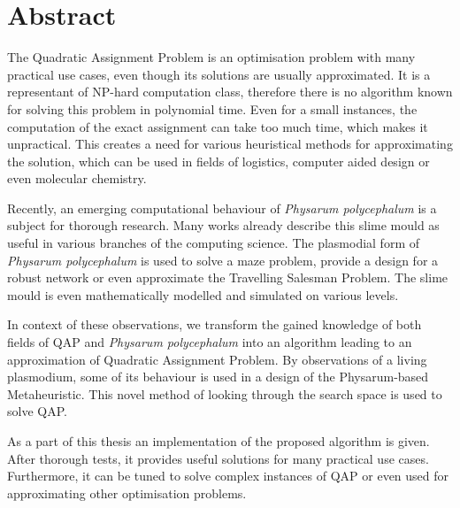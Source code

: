 \chapter*{Abstract}

The Quadratic Assignment Problem is an optimisation problem with many practical use cases, even though its solutions are usually approximated. It is a representant of NP-hard computation class, therefore there is no algorithm known for solving this problem in polynomial time. Even for a small instances, the computation of the exact assignment can take too much time, which makes it unpractical. This creates a need for various heuristical methods for approximating the solution, which can be used in fields of logistics, computer aided design or even molecular chemistry.

Recently, an emerging computational behaviour of \textit{Physarum polycephalum} is a subject for thorough research. Many works already describe this slime mould as useful in various branches of the computing science. The plasmodial form of \textit{Physarum polycephalum} is used to solve a maze problem, provide a design for a robust network or even approximate the Travelling Salesman Problem. The slime mould is even mathematically modelled and simulated on various levels.

In context of these observations, we transform the gained knowledge of both fields of QAP and \textit{Physarum polycephalum} into an algorithm leading to an approximation of Quadratic Assignment Problem. By observations of a living plasmodium, some of its behaviour is used in a design of the Physarum-based Metaheuristic. This novel method of looking through the search space is used to solve QAP.

As a part of this thesis an implementation of the proposed algorithm is given. After thorough tests, it provides useful solutions for many practical use cases. Furthermore, it can be tuned to solve complex instances of QAP or even used for approximating other optimisation problems.
